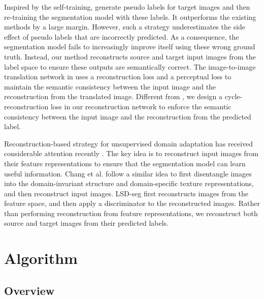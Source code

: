 \documentclass[runningheads]{llncs}
\begin{document}
	Inspired by the self-training, \cite{li2019bidirectional,huang2020contextual,pan2020unsupervised,wang2020differential,kim2020learning,yang2020fda} generate pseudo labels for target images and then re-training the segmentation model with these labels. It outperforms the existing methods by a large margin. However, such a strategy underestimates the side effect of pseudo labels that are incorrectly predicted. As a consequence, the segmentation model fails to increasingly improve itself using these wrong ground truth. Instead, our method reconstructs source and target input images from the label space to ensure these outputs are semantically correct. The image-to-image translation network in \cite{li2019bidirectional} uses a reconstruction loss and a perceptual loss to maintain the semantic consistency between the input image and the reconstruction from the translated image. Different from \cite{li2019bidirectional}, we design a cycle-reconstruction loss in our reconstruction network to enforce the semantic consistency between the input image and the reconstruction from the predicted label.
	
	Reconstruction-based strategy for unsupervised domain adaptation has received considerable attention recently \cite{ghifary2016deep,bousmalis2016domain}. The key idea is to reconstruct input images from their feature representations to ensure that the segmentation model can learn useful information. Chang et al. \cite{chang2019all} follow a similar idea to first disentangle images into the domain-invariant structure and domain-specific texture representations, and then reconstruct input images. LSD-seg \cite{sankaranarayanan2018learning} first reconstructs images from the feature space, and then apply a discriminator to the reconstructed images. Rather than performing reconstruction from feature representations, we reconstruct both source and target images from their predicted labels.
	




	\section{Algorithm}
	\subsection{Overview}
	
\end{document}
